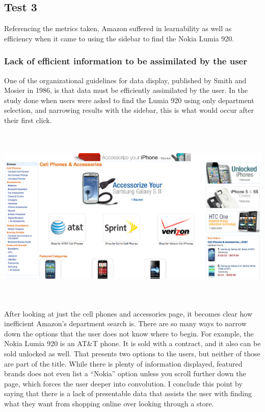 \documentclass[11pt, oneside]{article}   	%
\begin{document}
\subsection{Test 3}
Referencing the metrics taken, Amazon suffered in learnability as well as efficiency when it came to using the sidebar to find the Nokia Lumia 920.
\subsubsection{Lack of efficient information to be assimilated by the user}
One of the organizational guidelines for data display, published by Smith and Mosier in 1986, is that data must be efficiently assimilated by the user. In the study done when users were asked to find the Lumia 920 using only department selection, and narrowing results with the sidebar, this is what would occur after their first click.

\includegraphics[width=6in, height=3.4in]{Amazon3}

After looking at just the cell phones and accessories page, it becomes clear how inefficient Amazon's department search is. There are so many ways to narrow down the options that the user does not know where to begin. For example, the Nokia Lumia 920 is an AT\&T phone. It is sold with a contract, and it also can be sold unlocked as well. That presents two options to the users, but neither of those are part of the title. While there is plenty of information displayed, featured brands does not even list a ``Nokia'' option unless you scroll further down the page, which forces the user deeper into convolution. I conclude this point by saying that there is a lack of presentable data that assists the user with finding what they want from shopping online over looking through a store.
\end{document}
